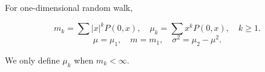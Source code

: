 For one-dimensional random walk,

$$m_k = \sum |x|^k P(0,x), \quad \mu_k = \sum x^k P(0,x), \quad k \geq 1.$$
$$\mu = \mu_1, \quad m = m_1, \quad \sigma^2 = \mu_2 - \mu^2.$$

We only define $\mu_k$ when $m_k < \infty$.